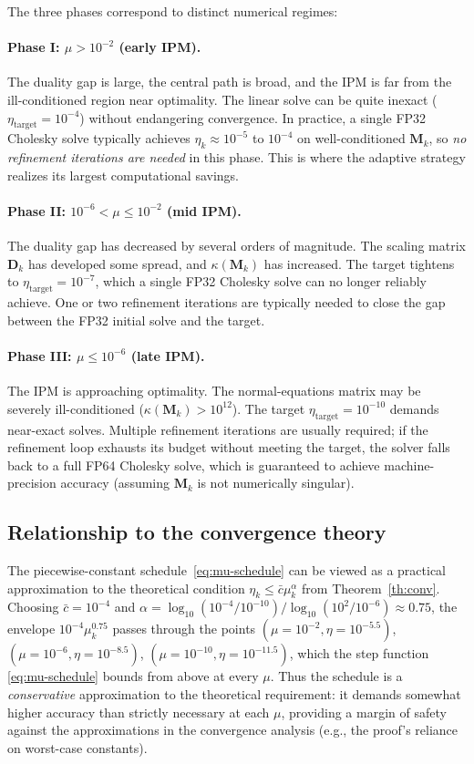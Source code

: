 \documentclass[11pt,twoside]{article}
\newcommand{\bD}{\mathbf{D}}
\newcommand{\bM}{\mathbf{M}}
\newcommand{\cond}{\kappa}
\begin{document}
The three phases correspond to distinct numerical regimes:

\paragraph{Phase I: $\mu > 10^{-2}$ (early IPM).}
The duality gap is large, the central path is broad, and the IPM is far
from the ill-conditioned region near optimality.  The linear solve can be
quite inexact ($\eta_{\text{target}} = 10^{-4}$) without endangering
convergence.  In practice, a single FP32 Cholesky solve typically achieves
$\eta_k \approx 10^{-5}$ to $10^{-4}$ on well-conditioned $\bM_k$, so
\emph{no refinement iterations are needed} in this phase.  This is where
the adaptive strategy realizes its largest computational savings.

\paragraph{Phase II: $10^{-6} < \mu \le 10^{-2}$ (mid IPM).}
The duality gap has decreased by several orders of magnitude.  The scaling
matrix $\bD_k$ has developed some spread, and $\cond(\bM_k)$ has
increased.  The target tightens to $\eta_{\text{target}} = 10^{-7}$,
which a single FP32 Cholesky solve can no longer reliably achieve.  One
or two refinement iterations are typically needed to close the gap between
the FP32 initial solve and the target.

\paragraph{Phase III: $\mu \le 10^{-6}$ (late IPM).}
The IPM is approaching optimality.  The normal-equations matrix may be
severely ill-conditioned ($\cond(\bM_k) > 10^{12}$).  The target
$\eta_{\text{target}} = 10^{-10}$ demands near-exact solves.  Multiple
refinement iterations are usually required; if the refinement loop exhausts
its budget without meeting the target, the solver falls back to a full FP64
Cholesky solve, which is guaranteed to achieve machine-precision accuracy
(assuming $\bM_k$ is not numerically singular).

\subsection{Relationship to the convergence theory}

The piecewise-constant schedule~\eqref{eq:mu-schedule} can be viewed as a
practical approximation to the theoretical condition $\eta_k \le
\bar{c}\mu_k^\alpha$ from Theorem~\ref{th:conv}.  Choosing
$\bar{c} = 10^{-4}$ and $\alpha = \log_{10}(10^{-4}/10^{-10}) /
\log_{10}(10^2/10^{-6}) \approx 0.75$, the envelope
$10^{-4}\mu_k^{0.75}$ passes through the points
$(\mu=10^{-2}, \eta=10^{-5.5})$, $(\mu=10^{-6}, \eta=10^{-8.5})$,
$(\mu=10^{-10}, \eta=10^{-11.5})$, which the step function
\eqref{eq:mu-schedule} bounds from above at every $\mu$.  Thus the
schedule is a \emph{conservative} approximation to the theoretical
requirement: it demands somewhat higher accuracy than strictly necessary
at each $\mu$, providing a margin of safety against the approximations in
the convergence analysis (e.g., the proof's reliance on worst-case
constants).
\end{document}
